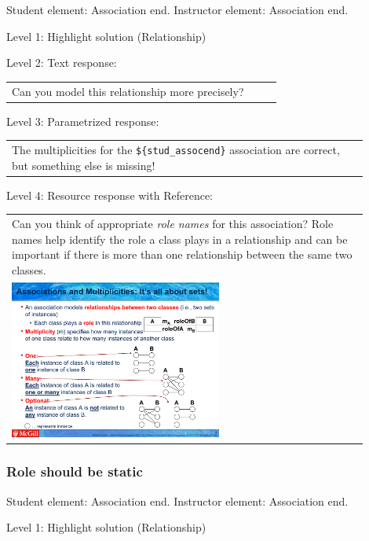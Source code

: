 Student element: Association end. Instructor element: Association end. \medskip

\noindent Level 1: Highlight solution (Relationship) \medskip

\noindent Level 2: Text response: \medskip

\begin{tabular}{|p{0.9\linewidth}}
Can you model this relationship more precisely?
\end{tabular} \medskip

\noindent Level 3: Parametrized response: \medskip

\begin{tabular}{|p{0.9\linewidth}}
The multiplicities for the \verb|${stud_assocend}| association are correct, but something else is missing!
\end{tabular} \medskip

\noindent Level 4: Resource response with Reference: \medskip

\begin{tabular}{|p{0.9\linewidth}}
Can you think of appropriate \textit{role names}
for this association? Role names help identify the role a class plays in a
relationship and can be important if there is more than one relationship
between the same two classes.

\\
\includegraphics[width=0.6\textwidth]{images/role_name.png}

\end{tabular} \medskip


\subsubsection{Role should be static}

Student element: Association end. Instructor element: Association end. \medskip

\noindent Level 1: Highlight solution (Relationship) \medskip

